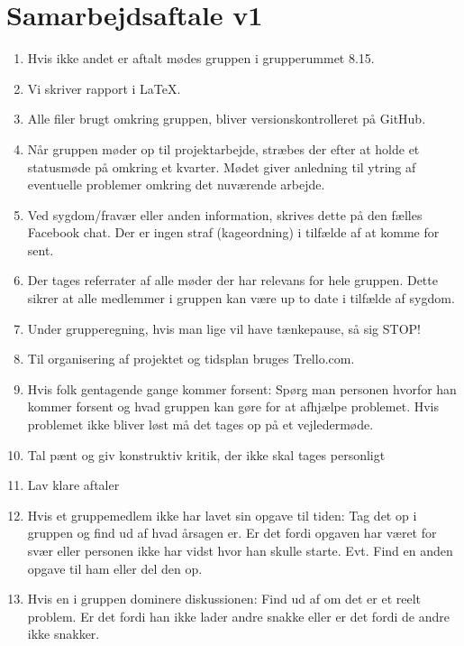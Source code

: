 \documentclass{article}
\begin{document}
	\section*{Samarbejdsaftale v1}

	\begin{enumerate}
		\item Hvis ikke andet er aftalt mødes gruppen i grupperummet 8.15.

		\item Vi skriver rapport i LaTeX.

		\item Alle filer brugt omkring gruppen, bliver versionskontrolleret på GitHub.

		\item Når gruppen møder op til projektarbejde, stræbes der efter at holde et statusmøde på omkring et kvarter. Mødet giver anledning til ytring af eventuelle problemer omkring det nuværende arbejde.

		\item Ved sygdom/fravær eller anden information, skrives dette på den fælles Facebook chat. Der er ingen straf (kageordning) i tilfælde af at komme for sent.

		\item Der tages referrater af alle møder der har relevans for hele gruppen. Dette
    	sikrer at alle medlemmer i gruppen kan være up to date i tilfælde af sygdom.

    	\item Under grupperegning, hvis man lige vil have tænkepause, så sig STOP!

    	\item Til organisering af projektet og tidsplan bruges Trello.com.

    	\item Hvis folk gentagende gange kommer forsent: Spørg man personen hvorfor han kommer forsent og hvad gruppen kan gøre for at afhjælpe problemet. Hvis problemet ikke bliver løst må det tages op på et vejledermøde. 

    	\item Tal pænt og giv konstruktiv kritik, der ikke skal tages personligt

    	\item Lav klare aftaler

    	\item Hvis et gruppemedlem ikke har lavet sin opgave til tiden: Tag det op i gruppen og find ud af hvad årsagen er. Er det fordi opgaven har været for svær eller personen ikke har vidst hvor han skulle starte. Evt. Find en anden opgave til ham eller del den op.

    	\item Hvis en i gruppen dominere diskussionen: Find ud af om det er et reelt problem. Er det fordi han ikke lader andre snakke eller er det fordi de andre ikke snakker. 

	\end{enumerate}
\end{document}
